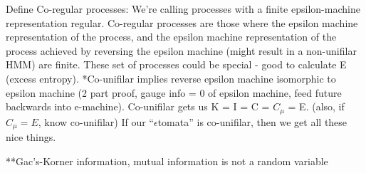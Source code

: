 \documentclass[prl,twocolumn,superscriptaddress,preprintnumbers,floatfix]{revtex4-1}
\begin{document}
Define Co-regular processes: We're calling processes with a finite epsilon-machine representation regular. Co-regular processes are those where the epsilon machine representation of the process, and the epsilon machine representation of the process achieved by reversing the epsilon machine (might result in a non-unifilar HMM) are finite.  These set of processes could be special - good to calculate E (excess entropy).  *Co-unifilar implies reverse epsilon machine isomorphic to epsilon machine (2 part proof, gauge info = 0 of epsilon machine, feed future backwards into e-machine). Co-unifilar gets us K = I = C = $C_{\mu}$ = E.  (also, if $C_{\mu} = E$, know co-unifilar) If our ``$\epsilon$tomata'' is co-unifilar, then we get all these nice things.  

**Gac's-Korner information, mutual information is not a random variable 



\end{document}
